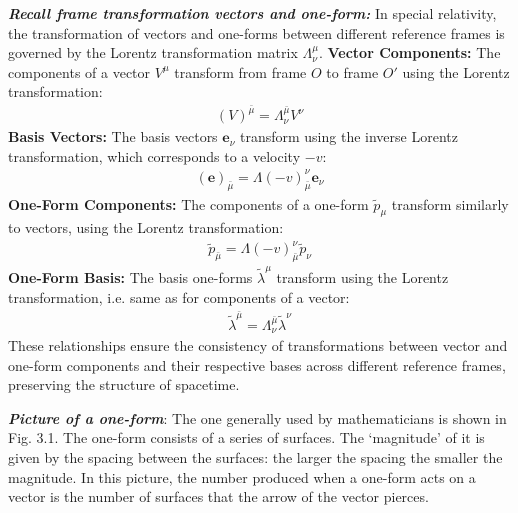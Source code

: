 \documentclass[11pt,letterpaper]{book}
\begin{document}
    \textbf{\textit{Recall frame transformation vectors and one-form:}} In special relativity, the transformation of vectors and one-forms between different reference frames is governed by the Lorentz transformation matrix \(\Lambda^\mu_\nu\).
    \textbf{Vector Components:}
    The components of a vector \(V^\mu\) transform from frame \(O\) to frame \(O'\) using the Lorentz transformation:
    \begin{align}
    (V)^{\bar{\mu}} = \Lambda^{\bar{\mu}}_\nu V^\nu
    \end{align}
    \textbf{Basis Vectors:}
    The basis vectors \(\mathbf{e}_\nu\) transform using the inverse Lorentz transformation, which corresponds to a velocity \(-v\):
    \begin{align}
    (\mathbf{e})_{\bar{\mu}} = \Lambda(-v)^{\nu}_{\bar{\mu}} \mathbf{e}_\nu
    \end{align}
    \textbf{One-Form Components:}
    The components of a one-form \(\tilde{p}_\mu\) transform similarly to vectors, using the Lorentz transformation:
    \begin{align}
    \tilde{p}_{\bar{\mu} }= \Lambda(-v)_{\bar{\mu}}^{\nu} \tilde{p}_\nu
    \end{align}
    \textbf{One-Form Basis:}
    The basis one-forms \(\tilde{\lambda}^\mu\) transform using the Lorentz transformation, i.e. same as for components of a vector:
    \begin{align}
    \tilde{\lambda}^{\bar{\mu} }= \Lambda^{\bar{\mu}}_\nu \tilde{\lambda}^\nu
    \end{align}
    These relationships ensure the consistency of transformations between vector and one-form components and their respective bases across different reference frames, preserving the structure of spacetime.
    
    \textit{\textbf{Picture of a one-form}}: The one generally used by mathematicians is shown in Fig. 3.1. The one-form consists of a series of surfaces. The ‘magnitude’ of it is given by the spacing between the surfaces: the larger the spacing the smaller the magnitude. In this picture, the number produced when a one-form acts on a vector is the number of surfaces that the arrow of the vector pierces.
\end{document}
